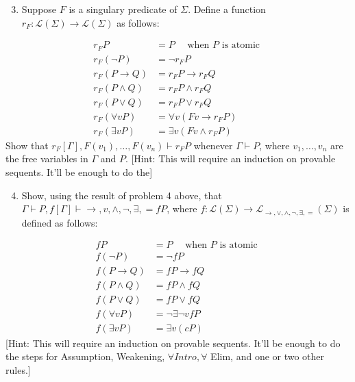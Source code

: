 \documentclass[10pt]{article}
\begin{document}
\begin{enumerate}
  \setcounter{enumi}{2}
  \item Suppose $F$ is a singulary predicate of $\Sigma$. Define a function $r_{F}: \mathcal{L}(\Sigma) \rightarrow \mathcal{L}(\Sigma)$ as follows:
\end{enumerate}
$$
\begin{aligned}
r_{F} P &=P \quad \text { when } P \text { is atomic } \\
r_{F}(\neg P) &=\neg r_{F} P \\
r_{F}(P \rightarrow Q) &=r_{F} P \rightarrow r_{F} Q \\
r_{F}(P \wedge Q) &=r_{F} P \wedge r_{F} Q \\
r_{F}(P \vee Q) &=r_{F} P \vee r_{F} Q \\
r_{F}(\forall v P) &=\forall v\left(F v \rightarrow r_{F} P\right) \\
r_{F}(\exists v P) &=\exists v\left(F v \wedge r_{F} P\right)
\end{aligned}
$$
Show that $r_{F}[\Gamma], F\left(v_{1}\right), \ldots, F\left(v_{n}\right) \vdash r_{F} P$ whenever $\Gamma \vdash P$, where $v_{1}, \ldots, v_{n}$ are the free variables in $\Gamma$ and $P$. [Hint: This will require an induction on provable sequents. It'll be enough to do the]
\begin{enumerate}
  \setcounter{enumi}{3}
  \item Show, using the result of problem 4 above, that $\Gamma \vdash P, f[\Gamma] \vdash \rightarrow, v, \wedge, \neg, \exists,=f P$, where $f: \mathcal{L}(\Sigma) \rightarrow \mathcal{L}_{\rightarrow, \vee, \wedge, \neg, \exists,=}(\Sigma)$ is defined as follows:
\end{enumerate}
$$
\begin{aligned}
f P &=P \quad \text { when } P \text { is atomic } \\
f(\neg P) &=\neg f P \\
f(P \rightarrow Q) &=f P \rightarrow f Q \\
f(P \wedge Q) &=f P \wedge f Q \\
f(P \vee Q) &=f P \vee f Q \\
f(\forall v P) &=\neg \exists \neg v f P \\
f(\exists v P) &=\exists v(c P)
\end{aligned}
$$
[Hint: This will require an induction on provable sequents. It'll be enough to do the steps for Assumption, Weakening, $\forall I n t r o, \forall$ Elim, and one or two other rules.]
\end{document}
